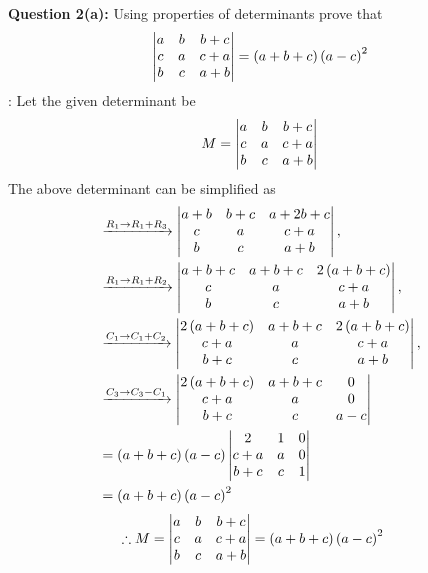\documentclass[journal,12pt,twocolumn]{IEEEtran}
\begin{document}
		\maketitle
		\newpage
		\bigskip
		\textbf{Question 2(a):}
		Using properties of determinants prove that
		\begin{align}
	       \begin{vmatrix}a & b & b+c \\ c & a & c+a \\  b& c & a+b \\\end{vmatrix} =
		   \left(a+b+c\right) \left(a-c\right)^2
		\end{align}
	    \solution : Let the given determinant be 
	    \begin{align}
	        M = \begin{vmatrix}a & b & b+c \\ c & a & c+a \\ b & c & a+b \\\end{vmatrix}
	    \end{align}
            The above determinant can be simplified as
        \begin{align}
            &\xrightarrow {R_1 \rightarrow R_1 +R_3}
           \begin{vmatrix}a+b & b+c & a+2b+c \\ c & a & c+a \\ b & c & a+b\end{vmatrix}, 
        	\\
        	&\xrightarrow {R_1 \rightarrow R_1 +R_2}
        	\begin{vmatrix}a+b+c & a+b+c & 2\left(a+b+c\right) \\ c & a & c+a \\ b & c & a+b\end{vmatrix}, 
        	\\
            &\xrightarrow {C_1 \rightarrow C_1 +C_2}
            \begin{vmatrix}2\left(a+b+c\right) & a+b+c & 2\left(a+b+c\right)  \\ c+a & a & c+a \\ b+c & c & a+b\end{vmatrix}, 
            \\
        	&\xrightarrow {C_3 \rightarrow C_3 -C_1}
        	\begin{vmatrix}2\left(a+b+c\right) & a+b+c & 0 \\ c+a & a & 0 \\ b+c & c & a-c\end{vmatrix}
        	\\
        	&=\left(a+b+c\right)	\left(a-c\right)\begin{vmatrix}2 & 1 & 0 \\ c+a & a & 0 \\ b+c & c & 1\end{vmatrix}
        	\\
        	&=\left(a+b+c\right) \left(a-c\right)^2
        \end{align}
	    \begin{align} 
	    	\therefore M &= \begin{vmatrix}a & b & b+c \\ c & a & c+a \\  b& c & a+b \\\end{vmatrix} =
	    	\left(a+b+c\right) \left(a-c\right)^2
	    \end{align}
        	
\end{document}
